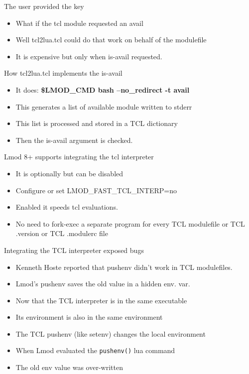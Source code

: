 \documentclass{beamer}
\begin{document}
\begin{frame}{The user provided the key}
  \begin{itemize}
    \item What if the tcl module requested an avail
    \item Well tcl2lua.tcl could do that work on behalf of the modulefile
    \item It is expensive but only when is-avail requested.
  \end{itemize}
\end{frame}

\begin{frame}{How tcl2lua.tcl implements the is-avail}
  \begin{itemize}
    \item It does: \textbf{\$LMOD\_CMD bash --no\_redirect -t avail}
    \item This generates a list of available module written to stderr
    \item This list is processed and stored in a TCL dictionary
    \item Then the is-avail argument is checked.
  \end{itemize}
\end{frame}

\begin{frame}{Lmod 8+ supports integrating the tcl interpreter}
  \begin{itemize}
    \item It is optionally but can be disabled
    \item Configure or set LMOD_FAST_TCL_INTERP=no
    \item Enabled it speeds tcl evaluations.
    \item No need to fork-exec a separate program for every TCL
      modulefile or TCL .version or TCL .modulerc file
  \end{itemize}
\end{frame}

\begin{frame}{Integrating the TCL interpreter exposed bugs}
  \begin{itemize}
    \item Kenneth Hoste reported that pushenv didn't work in TCL
      modulefiles.
    \item Lmod's pushenv saves the old value in a hidden env. var.
    \item Now that the TCL interpreter is in the same executable
    \item Its environment is also in the same environment
    \item The TCL pushenv (like setenv) changes the local environment
    \item When Lmod evaluated the \texttt{pushenv()} lua command
    \item The old env value was over-written
  \end{itemize}
\end{frame}
\end{document}
